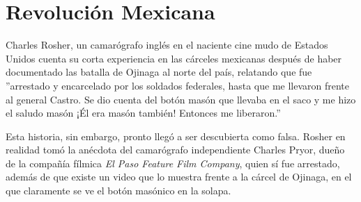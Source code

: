 \chapter{Revolución Mexicana}

Charles Rosher, un camarógrafo inglés en el naciente cine mudo de Estados Unidos cuenta su corta experiencia en las cárceles mexicanas después de haber documentado las batalla de Ojinaga al norte del país, relatando que fue ''arrestado y encarcelado por los soldados federales, hasta que me llevaron frente al general Castro. Se dio cuenta del botón masón que llevaba en el saco y me hizo el saludo masón ¡Él era masón también! Entonces me liberaron.''\cite{rocha2003}

Esta historia, sin embargo, pronto llegó a ser descubierta como falsa. Rosher en realidad tomó la anécdota del camarógrafo independiente Charles Pryor, dueño de la compañía fílmica \emph{El Paso Feature Film Company}\cite{worthington2010}, quien sí fue arrestado, además de que existe un video que lo muestra frente a la cárcel de Ojinaga, en el que claramente se ve el botón masónico en la solapa.